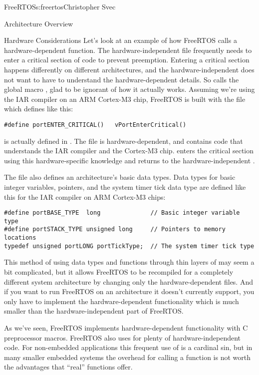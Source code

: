 \begin{aosachapter}{FreeRTOS}{s:freertos}{Christopher Svec}
\begin{aosasect1}{Architecture Overview}
\begin{aosasect2}{Hardware Considerations}
Let's look at an example of how FreeRTOS calls a hardware-dependent
function. The hardware-independent file  frequently
needs to enter a critical section of code to prevent
preemption. Entering a critical section happens differently on
different architectures, and the hardware-independent 
does not want to have to understand the hardware-dependent details.
So  calls the global macro
, glad to be ignorant of how it actually
works.  Assuming we're using the IAR compiler on an ARM Cortex-M3
chip, FreeRTOS is built with the file
 which defines
 like this:

\begin{verbatim}
#define portENTER_CRITICAL()   vPortEnterCritical()
\end{verbatim}

\noindent {} is actually defined in
. The 
file is hardware-dependent, and contains code that understands the IAR
compiler and the Cortex-M3 chip.  enters
the critical section using this hardware-specific knowledge and
returns to the hardware-independent .

The  file also defines an architecture's basic data
types.  Data types for basic integer variables, pointers, and the
system timer tick data type are defined like this for the IAR compiler
on ARM Cortex-M3 chips:

\begin{verbatim}
#define portBASE_TYPE  long              // Basic integer variable type
#define portSTACK_TYPE unsigned long     // Pointers to memory locations
typedef unsigned portLONG portTickType;  // The system timer tick type
\end{verbatim}


This method of using data types and functions through thin layers of
 may seem a bit complicated, but it allows FreeRTOS to
be recompiled for a completely different system architecture by
changing only the hardware-dependent files. And if you want to run
FreeRTOS on an architecture it doesn't currently support, you only have
to implement the hardware-dependent functionality which is much
smaller than the hardware-independent part of FreeRTOS.

As we've seen, FreeRTOS implements hardware-dependent functionality
with C preprocessor  macros. FreeRTOS also uses
 for plenty of hardware-independent code. For
non-embedded applications this frequent use of  is a
cardinal sin, but in many smaller embedded systems the overhead for
calling a function is not worth the advantages that ``real'' functions
offer.


\end{aosasect2}
\end{aosasect1}
\end{aosachapter}
